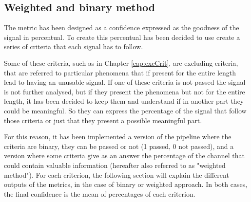 \subsection{Weighted and binary method}
The metric has been designed as a confidence expressed as the goodness of the signal in percentual. To create this percentual has been decided to use create a series of criteria that each signal has to follow. 

Some of these criteria, such as in Chapter \ref{cap:excCrit}, are excluding criteria, that are referred to particular phenomena that if present for the entire length lead to having an unusable signal.
If one of these criteria is not passed the signal is not further analysed, but if they present the phenomena but not for the entire length, it has been decided to keep them and understand if in another part they could be meaningful. So they can express the percentage of the signal that follow those criteria or just that they present a possible meaningful part. 

For this reason, it has been implemented a version of the pipeline where the criteria are binary, they can be passed or not (1 passed, 0 not passed), and a version where some criteria give as an answer the percentage of the channel that could contain valuable information (hereafter also referred to as "weighted method"). For each criterion, the following section will explain the different outputs of the metrics, in the case of binary or weighted approach.
In both cases, the final confidence is the mean of percentages of each criterion.

